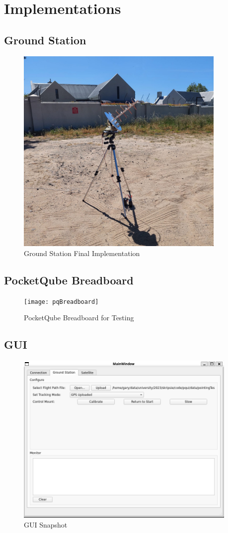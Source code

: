 \chapter{Implementations}
\section{Ground Station}
\begin{figure}[!htb]
  \centering
  \includegraphics[width=0.9\textwidth]{gsTripod}
  \caption{Ground Station Final Implementation}
  \label{fig:gsTripod}
\end{figure}
\newpage
\section{PocketQube Breadboard}\label{sec:appendix_pq_breadboard}
\begin{figure}[!htb]
    \centering
    \texttt{[image: pqBreadboard]}
    \caption{PocketQube Breadboard for Testing}
    \label{fig:pqBreadboard}
\end{figure}
\newpage
\section{GUI}
\begin{figure}[!htb]
  \centering
  \includegraphics[width=0.95\textwidth]{guiSnapshot}
  \caption{GUI Snapshot}
  \label{fig:guiSnapshot}
\end{figure}